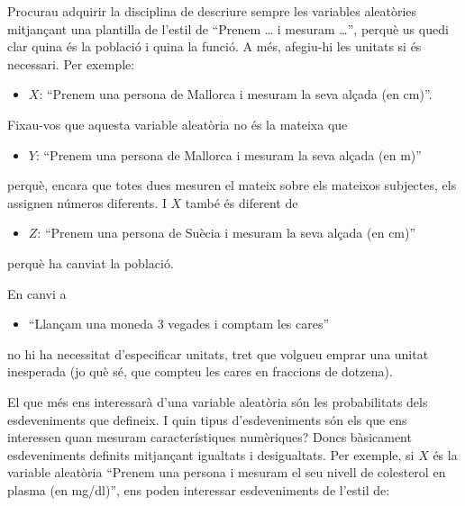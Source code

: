 \documentclass[
]{book}
\providecommand{\tightlist}{%
  \setlength{\itemsep}{0pt}\setlength{\parskip}{0pt}}
\newenvironment{rmdblock}[1]
  {
  \begin{itemize}
  \renewcommand{\labelitemi}{
    \raisebox{-.7\height}[0pt][0pt]{
      {\setkeys{Gin}{width=3em,keepaspectratio}\texttt{[image: Bioestadística-II\_files/figure-html/\#1]}}
    }
  }
  \setlength{\fboxsep}{1em}
  \begin{kframe}
  \item
  }
  {
  \end{kframe}
  \end{itemize}
  }
\newenvironment{rmdimportant}
  {\begin{rmdblock}{important}}
  {\end{rmdblock}}
\theoremstyle{definition}
\theoremstyle{definition}
\theoremstyle{definition}
\theoremstyle{remark}
\begin{document}
\begin{rmdimportant}
Procurau adquirir la disciplina de descriure sempre les variables aleatòries mitjançant una plantilla de l'estil de ``Prenem \ldots{} i mesuram \ldots{}'', perquè us quedi clar quina és la població i quina la funció. A més, afegiu-hi les unitats si és necessari. Per exemple:

\begin{itemize}
\tightlist
\item
  \(X\): ``Prenem una persona de Mallorca i mesuram la seva alçada (en cm)''.
\end{itemize}

Fixau-vos que aquesta variable aleatòria no és la mateixa que

\begin{itemize}
\tightlist
\item
  \(Y\): ``Prenem una persona de Mallorca i mesuram la seva alçada (en m)''
\end{itemize}

perquè, encara que totes dues mesuren el mateix sobre els mateixos subjectes, els assignen números diferents. I \(X\) també és diferent de

\begin{itemize}
\tightlist
\item
  \(Z\): ``Prenem una persona de Suècia i mesuram la seva alçada (en cm)''
\end{itemize}

perquè ha canviat la població.

En canvi a

\begin{itemize}
\tightlist
\item
  ``Llançam una moneda 3 vegades i comptam les cares''
\end{itemize}

no hi ha necessitat d'especificar unitats, tret que volgueu emprar una unitat inesperada (jo què sé, que compteu les cares en fraccions de dotzena).
\end{rmdimportant}

El que més ens interessarà d'una variable aleatòria són les probabilitats dels esdeveniments que defineix. I quin tipus d'esdeveniments són els que ens interessen quan mesuram característiques numèriques? Doncs bàsicament esdeveniments definits mitjançant igualtats i desigualtats. Per exemple, si \(X\) és la variable aleatòria ``Prenem una persona i mesuram el seu nivell de colesterol en plasma (en mg/dl)'', ens poden interessar esdeveniments de l'estil de:
\end{document}
